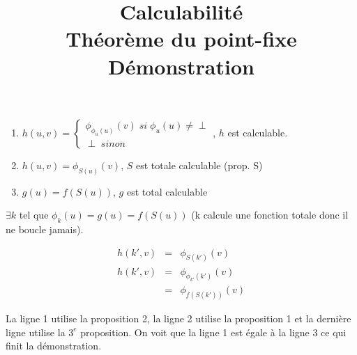 \documentclass[a4paper,onecolumn,12pt]{IEEETran}
\title{Calculabilité\\Théorème du point-fixe\\Démonstration}
\begin{document}
\maketitle

\begin{enumerate}
	\item $h(u,v) = 
			\left\lbrace
			\begin{array}{lcl}
				\phi_{\phi_u(u)}(v) \; si \; \phi_u(u) \neq \perp \\
				\perp \; sinon
			\end{array}\right.$, $h$ est calculable.
	\item $h(u,v) = \phi_{S(u)}(v)$, $S$ est totale calculable (prop. S)
	\item $g(u)=f(S(u))$, $g$ est total calculable
\end{enumerate}

$\exists k$ tel que $\phi_k(u)=g(u)=f(S(u))$ (k calcule une fonction totale donc il ne boucle jamais).

\begin{eqnarray}
	h(k',v) &=& \phi_{S(k')}(v)\\
	h(k',v) &=& \phi_{\phi_{k'}(k')}(v) \\
	&=& \phi_{f(S(k'))}(v)
\end{eqnarray}

La ligne 1 utilise la proposition 2, la ligne 2 utilise la proposition 1 et la dernière ligne utilise la $3^e$ proposition. On voit que la ligne 1 est égale à la ligne 3 ce qui finit la démonstration.
\end{document}
